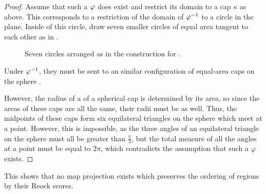 \begin{proof}

  Assume that such a $\varphi$ does exist and restrict its domain to
  a cap $\kappa$ as above.  This corresponds to a restriction of the
  domain of $\varphi^{-1}$ to a circle in the plane.  Inside of this
  circle, draw seven smaller circles of equal area tangent to each
  other as in .

  \begin{figure}[!htb]
    \label{fig:sevencircles}

    \centering

    
    \caption{Seven circles arranged as in the construction for .}
  \end{figure}	
  Under $\varphi^{-1}$, they must be sent to an similar configuration 
  of equal-area caps on the sphere .  

  However, the radius of a
  of a spherical cap is determined by its area, so since the areas of
  these caps are all the same, their radii must be as well. Thus, 
  the midpoints of these caps form six equilateral triangles on the sphere
  which meet at a point.  However, this is impossible, as the three 
  angles of an equilateral triangle on the sphere must all be greater
  than $\tfrac{\pi}{3}$, but the total measure of all the angles at
  a point must be equal to
  $2\pi$, which contradicts the assumption that such a $\varphi$ exists.
\end{proof}

This shows that no map projection exists which preserves the ordering of regions by their Reock scores.
